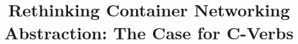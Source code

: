 \documentclass{cls/sig-alternate-10pt}
\begin{document}
\title{Rethinking Container Networking Abstraction: The Case for C-Verbs}

\date{}


\maketitle
\thispagestyle{empty}






%
%
\end{document}
